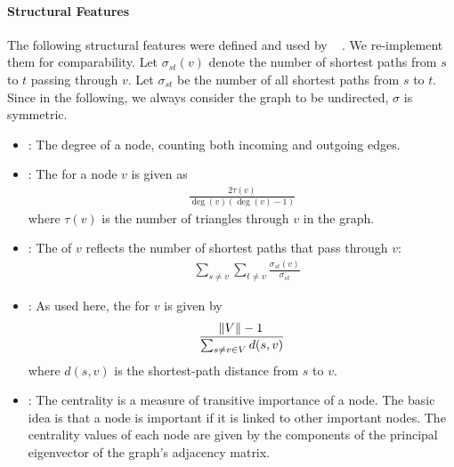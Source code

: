 \documentclass[
	fontsize=10pt, %
	twoside=false, %
	secnumdepth=1, %
  toc=indentunnumbered %
]{kaobook}
\begin{document}
\paragraph{Structural Features} The following structural features were defined
and used by \citeauthor{nielsen_MachineLearningSupport_2019}~\cite{nielsen_MachineLearningSupport_2019}
. We re-implement
them for comparability. Let $\sigma_{st}(v)$ denote the number of shortest paths
from $s$ to $t$ passing through $v$. Let $\sigma_{st}$ be the number of all shortest
paths from $s$ to $t$. Since in the following, we always consider the graph to
be undirected, $\sigma$ is symmetric.

\begin{itemize}
\item {}: The degree of a node, counting both incoming and
  outgoing edges.
\item {}: The 
  \cite{brandes_NetworkAnalysisMethodological_2005}
  for a
  node $v$ is given as
  \begin{align*}
    \frac{2 \tau(v)}{\deg(v)(\deg(v)-1)}
  \end{align*}
  where $\tau(v)$ is the number of triangles through $v$ in the graph.
\item {}: The  of $v$
  reflects the number of shortest paths that pass through $v$:
  \begin{align*}
    & \sum_{s \not= v} \sum_{t \not= v} \frac{\sigma_{st}(v)}{\sigma_{st}}
  \end{align*}
\item {}: As used here, the  for $v$ is given by
  \begin{align*}
    \frac{\norm{V}-1}{\sum_{s \not= v \in V} d(s,v)}
  \end{align*}
  where $d(s,v)$ is the shortest-path distance from $s$ to $v$.
\item {}: The  centrality is a
  measure of transitive importance of a node. The basic idea is that a node is
  important if it is linked to other important nodes. The centrality values of
  each node are given by the components of the principal eigenvector of the graph's
  adjacency matrix.
\end{itemize}
\end{document}
